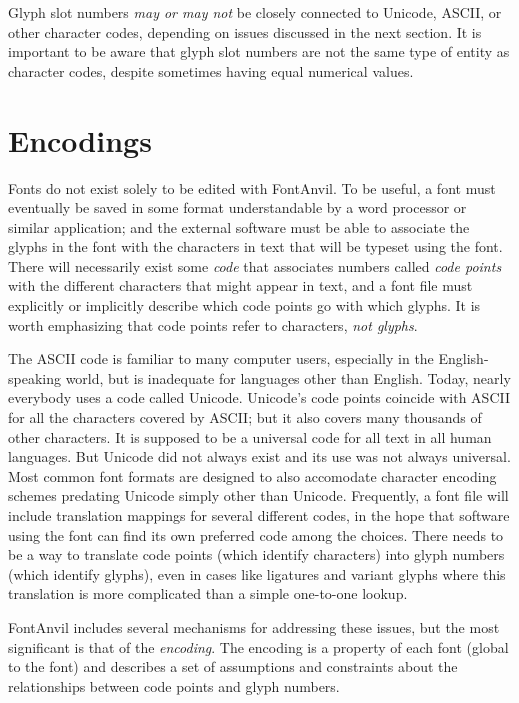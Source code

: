 \documentclass[11pt]{report}
\begin{document}
Glyph slot numbers \emph{may or may not} be closely connected to Unicode,
ASCII, or other character codes, depending on issues discussed in the next
section.  It is important to be aware that glyph slot numbers are not the
same type of entity as character codes, despite sometimes having equal
numerical values.

\section{Encodings}

Fonts do not exist solely to be edited with FontAnvil.  To be useful, a font
must eventually be saved in some format understandable by a word processor
or similar application; and the external software must be able to associate
the glyphs in the font with the characters in text that will be typeset
using the font.  There will necessarily exist some \emph{code} that
associates numbers called \emph{code points} with the different characters
that might appear in text, and a font file must explicitly or implicitly
describe which code points go with which glyphs.  It is worth emphasizing
that code points refer to characters, \emph{not glyphs}.

The ASCII code is familiar to many computer users, especially in the
English-speaking world, but is inadequate for languages other than English. 
Today, nearly everybody uses a code called Unicode.  Unicode's code points
coincide with ASCII for all the characters covered by ASCII; but it also
covers many thousands of other characters.  It is supposed to be a universal
code for all text in all human languages.  But Unicode did not always exist and its use was not always
universal.  Most common font formats are designed to also accomodate
character encoding schemes predating Unicode simply other than Unicode. 
Frequently, a font file will include translation mappings for several
different codes, in the hope that software using the font can find its own
preferred code among the choices.  There needs to be a way to translate code
points (which identify characters) into glyph numbers (which identify
glyphs), even in cases like ligatures and variant glyphs where this
translation is more complicated than a simple one-to-one lookup.

FontAnvil includes several mechanisms for addressing these issues, but the
most significant is that of the \emph{encoding}.  The encoding is a
property of each font (global to the font) and describes a set of
assumptions and constraints about the relationships between code points and
glyph numbers.
\end{document}

